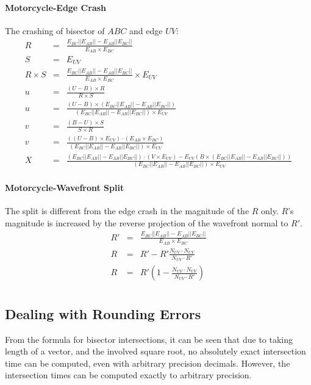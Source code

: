 \documentclass[12pt,a4paper,oneside,openany]{article}
\begin{document}
\paragraph{Motorcycle-Edge Crash}
The crashing of bisector of $ABC$ and edge $UV$:
\begin{eqnarray*}
R &=& \frac{E_{BC} || E_{AB} || - E_{AB}|| E_{BC} ||}{E_{AB} \times E_{BC}} \\
S &=& E_{UV} \\
R \times S &=& \frac{E_{BC} || E_{AB} || - E_{AB}|| E_{BC} ||}{E_{AB} \times E_{BC}} \times E_{UV} \\
u &=& \frac{(U-B) \times R}{R \times S} \\
u &=& \frac{(U-B) \times \left( E_{BC} || E_{AB} || - E_{AB}|| E_{BC} ||\right)}{(E_{BC} || E_{AB} || - E_{AB}|| E_{BC} ||) \times E_{UV}} \\
v &=& \frac{(B-U) \times S}{S \times R} \\
v &=& \frac{\left((U-B) \times E_{UV}\right) \cdot (E_{AB} \times E_{BC})}{(E_{BC} || E_{AB} || - E_{AB}|| E_{BC} ||) \times E_{UV}} \\
X &=& \frac{(E_{BC} || E_{AB} || - E_{AB}|| E_{BC} ||) \cdot (V \times E_{UV}) - E_{UV} (B \times (E_{BC} || E_{AB} || - E_{AB}|| E_{BC} ||))}{(E_{BC} || E_{AB} || - E_{AB}|| E_{BC} ||) \times E_{UV}}
\end{eqnarray*}

\paragraph{Motorcycle-Wavefront Split}

The split is different from the edge crash in the magnitude of the $R$ only. $R$'s magnitude is increased by the reverse projection of the wavefront normal to $R'$.
\begin{eqnarray*}
R' &=& \frac{E_{BC} || E_{AB} || - E_{AB}|| E_{BC} ||}{E_{AB} \times E_{BC}} \\
R &=& R' - R' \frac{N_{UV} \cdot N_{UV}}{N_{UV} \cdot R'} \\
R &=& R' \left( 1 - \frac{N_{UV} \cdot N_{UV}}{N_{UV} \cdot R'} \right)\\
\end{eqnarray*}


\subsection{Dealing with Rounding Errors}

From the formula for bisector intersections, it can be seen that due to taking length of a vector, and the involved square root, no absolutely exact intersection time can be computed, even with arbitrary precision decimals. However, the intersection times can be computed exactly to arbitrary precision.
\end{document}
